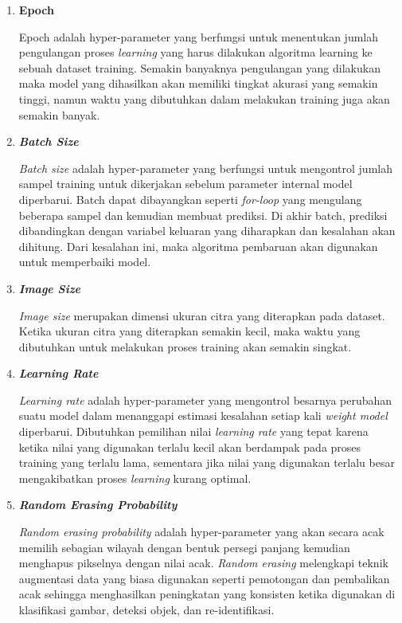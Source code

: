 \begin{enumerate}[nolistsep]

  \item \textbf{Epoch}
  
  Epoch adalah hyper-parameter yang berfungsi untuk menentukan jumlah pengulangan proses \emph{learning} 
  yang harus dilakukan algoritma learning ke sebuah dataset training. Semakin banyaknya pengulangan yang 
  dilakukan maka model yang dihasilkan akan memiliki tingkat akurasi yang semakin tinggi, namun waktu 
  yang dibutuhkan dalam melakukan training juga akan semakin banyak.

  \item \textbf{\emph{Batch Size}}
  
  \emph{Batch size} adalah hyper-parameter yang berfungsi untuk mengontrol jumlah sampel \linebreak training 
  untuk dikerjakan sebelum parameter internal model diperbarui. Batch dapat dibayangkan seperti \emph{for-loop} 
  yang mengulang beberapa sampel dan kemudian membuat prediksi. Di akhir batch, prediksi dibandingkan 
  dengan variabel keluaran yang diharapkan dan kesalahan akan dihitung. Dari kesalahan ini, maka algoritma 
  pembaruan akan digunakan untuk memperbaiki model. 

  \item \textbf{\emph{Image Size}}
  
  \emph{Image size} merupakan dimensi ukuran citra yang diterapkan pada dataset. Ketika ukuran citra yang 
  diterapkan semakin kecil, maka waktu yang dibutuhkan untuk melakukan proses training akan semakin singkat. 

  \item \textbf{\emph{Learning Rate}}
  
  \emph{Learning rate} adalah hyper-parameter yang mengontrol besarnya perubahan suatu model dalam menanggapi 
  estimasi kesalahan setiap kali \emph{weight model} diperbarui. Dibutuhkan pemilihan nilai \emph{learning rate} 
  yang tepat karena ketika nilai yang digunakan terlalu kecil akan berdampak pada proses training yang terlalu 
  lama, sementara jika nilai yang digunakan terlalu besar mengakibatkan proses \emph{learning} kurang optimal.


  \item \textbf{\emph{Random Erasing Probability}}
  
  \emph{Random erasing probability} adalah hyper-parameter yang akan secara acak memilih sebagian wilayah dengan 
  bentuk persegi panjang kemudian menghapus pikselnya dengan nilai acak. \emph{Random erasing} melengkapi teknik 
  augmentasi data yang biasa digunakan seperti pemotongan dan pembalikan acak sehingga menghasilkan peningkatan yang 
  konsisten ketika digunakan di klasifikasi gambar, deteksi objek, dan re-identifikasi.

\end{enumerate}

